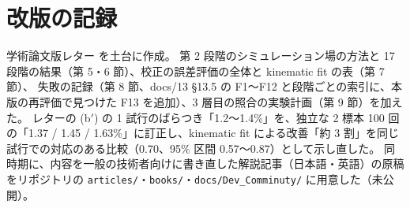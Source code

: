 \documentclass[paper=a4paper,fontsize=10pt,twocolumn,column_gap=2zw,line_length=24zw,number_of_lines=46,head_space=20mm]{jlreq}
\begin{document}
\section{改版の記録}
\small
\begin{description}\setlength{\itemsep}{0pt}
\item[第 1 版（2026-11-26）] 学術論文版レター \cite{letter2026} を土台に作成。
第 2 段階のシミュレーション場の方法と 17 段階の結果（第 5・6 節）、校正の誤差評価の全体と kinematic fit の表（第 7 節）、
失敗の記録（第 8 節、docs/13 §13.5 の F1〜F12 と段階ごとの索引に、本版の再評価で見つけた F13 を追加）、3 層目の照合の実験計画（第 9 節）を加えた。
レターの (b$'$) の 1 試行のばらつき「1.2〜1.4\%」を、独立な 2 標本 100 回の「1.37 / 1.45 / 1.63\%」に訂正し、kinematic fit による改善「約 3 割」を同じ試行での対応のある比較（0.70、95\% 区間 0.57〜0.87）として示し直した。
同時期に、内容を一般の技術者向けに書き直した解説記事（日本語・英語）の原稿をリポジトリの \texttt{articles/}・\texttt{books/}・\texttt{docs/Dev\_Comminuty/} に用意した（未公開）。
\end{description}
\end{document}
